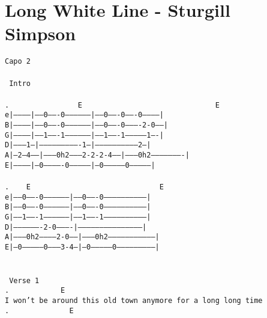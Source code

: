 \newpage
\section{Long White Line - Sturgill Simpson}
\label{Long White Line - Sturgill Simpson}
\texttt{Capo\ 2\\
\\
\lbrack\ Intro\rbrack\\
\\
.\ \ \ \ \ \ \ \ \ \ \ \ \ \ \ \ E\ \ \ \ \ \ \ \ \ \ \ \ \ \ \ \ \ \ \ \ \ \ \ \ \ \ \ \ \ \ \ E\\
e|-----------|-----0-------0-----------------|-----0-------0-------0-----------|\\
B|-----------|-----0-------0-----------------|-----0-------0----------2-0------|\\
G|-----------|-----1-------1-----------------|-----1-------1--------------1----|\\
D|--------1--|----------------------------1--|------------------------------2--|\\
A|--2--4-----|--------0h2--------2-2-2-4-----|--------0h2----------------------|\\
E|-----------|--0-------------0--------------|--0--------------0---------------|\\
\\
.\ \ \ \ E\ \ \ \ \ \ \ \ \ \ \ \ \ \ \ \ \ \ \ \ \ \ \ \ \ \ \ \ \ \ E\\
e|-----0-------0------------------|-----0-------0------------------------------|\\
B|-----0-------0------------------|-----0-------0------------------------------|\\
G|-----1-------1------------------|-----1-------1------------------------------|\\
D|-------------------2-0----------|--------------------------------------------|\\
A|--------0h2------------2-0------|--------0h2---------------------------------|\\
E|--0--------------0---------3-4--|--0--------------0--------------------------|\\
\\
\\
\lbrack\ Verse\ 1\rbrack\\
.\ \ \ \ \ \ \ \ \ \ \ \ E\ \\
I\ won't\ be\ around\ this\ old\ town\ anymore\ for\ a\ long\ long\ time\\
.\ \ \ \ \ \ \ \ \ \ \ \ \ \ E\\
}
